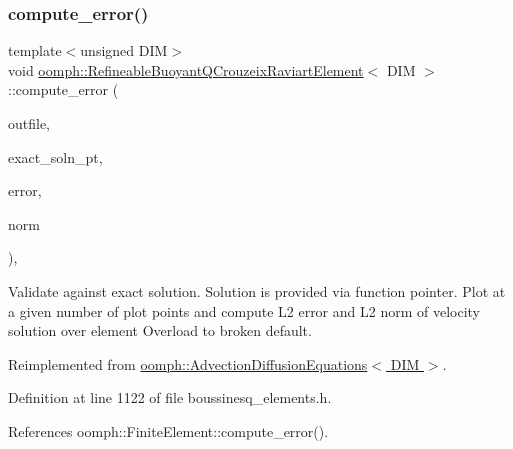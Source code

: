 \subsubsection{\texorpdfstring{compute\+\_\+error()}{compute\_error()}\hspace{0.1cm}{\footnotesize\ttfamily [2/2]}}
{\footnotesize\ttfamily template$<$unsigned D\+IM$>$ \\
void \hyperlink{classoomph_1_1RefineableBuoyantQCrouzeixRaviartElement}{oomph\+::\+Refineable\+Buoyant\+Q\+Crouzeix\+Raviart\+Element}$<$ D\+IM $>$\+::compute\+\_\+error (\begin{DoxyParamCaption}\item[{std\+::ostream \&}]{outfile,  }\item[{\hyperlink{classoomph_1_1FiniteElement_a690fd33af26cc3e84f39bba6d5a85202}{Finite\+Element\+::\+Steady\+Exact\+Solution\+Fct\+Pt}}]{exact\+\_\+soln\+\_\+pt,  }\item[{double \&}]{error,  }\item[{double \&}]{norm }\end{DoxyParamCaption})\hspace{0.3cm}{\ttfamily [inline]}, {\ttfamily [virtual]}}



Validate against exact solution. Solution is provided via function pointer. Plot at a given number of plot points and compute L2 error and L2 norm of velocity solution over element Overload to broken default. 



Reimplemented from \hyperlink{classoomph_1_1AdvectionDiffusionEquations_acb1fcfb29911210ad7c0bc252f0ed665}{oomph\+::\+Advection\+Diffusion\+Equations$<$ D\+I\+M $>$}.



Definition at line 1122 of file boussinesq\+\_\+elements.\+h.



References oomph\+::\+Finite\+Element\+::compute\+\_\+error().

\mbox{\label{classoomph_1_1RefineableBuoyantQCrouzeixRaviartElement_ab36052eddfa043777414ce64470bb0a3}} 
